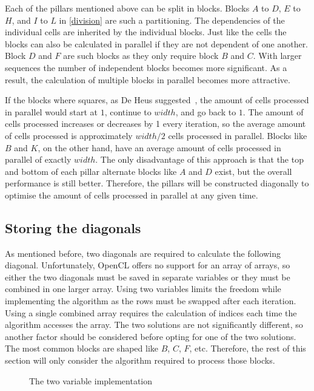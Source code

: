 Each of the pillars mentioned above can be split in blocks.
Blocks $A$ to $D$, $E$ to $H$, and $I$ to $L$ in \cref{division} are such a partitioning.
The dependencies of the individual cells are inherited by the individual blocks.
Just like the cells the blocks can also be calculated in parallel if they are not dependent of one another.
Block $D$ and $F$ are such blocks as they only require block $B$ and $C$.
With larger sequences the number of independent blocks becomes more significant.
As a result, the calculation of multiple blocks in parallel becomes more attractive.

If the blocks where squares, as De Heus suggested~\cite{Heus}, the amount of cells processed in parallel would start at $1$, continue to $width$, and go back to $1$.
The amount of cells processed increases or decreases by 1 every iteration, so the average amount of cells processed is approximately $width/2$ cells processed in parallel.
Blocks like $B$ and $K$, on the other hand, have an average amount of cells processed in parallel of exactly $width$.
The only disadvantage of this approach is that the top and bottom of each pillar alternate blocks like $A$ and $D$ exist, but the overall performance is still better.
Therefore, the pillars will be constructed diagonally to optimise the amount of cells processed in parallel at any given time.

\subsection{Storing the diagonals} \label{section:diagonal}
As mentioned before, two diagonals are required to calculate the following diagonal.
Unfortunately, OpenCL offers no support for an array of arrays, so either the two diagonals must be saved in separate variables or they must be combined in one larger array.
Using two variables limits the freedom while implementing the algorithm as the rows must be swapped after each iteration.
Using a single combined array requires the calculation of indices each time the algorithm accesses the array.
The two solutions are not significantly different, so another factor should be considered before opting for one of the two solutions.
The most common blocks are shaped like $B$, $C$, $F$, etc.
Therefore, the rest of this section will only consider the algorithm required to process those blocks.

\begin{figure}[p]
    \centering
    \subfloat[][Input]{\label{twovarsinput}}
    \subfloat[][Output]{\label{twovarsoutput}}
    \caption{The two variable implementation} \label{twovars}
\end{figure}

